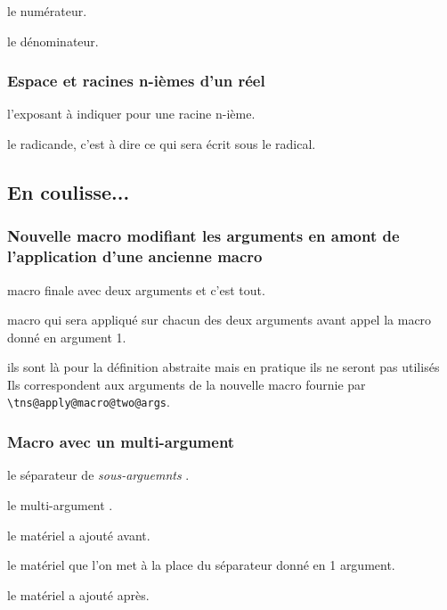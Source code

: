 \documentclass[12pt,a4paper]{article}
\newcommand\env[1]{\texttt{#1}}
\newcommand\macro[1]{\env{\textbackslash{}#1}}
\theoremstyle{definition}
\newcommand\extraspace{
	\vspace{0.25em}
}
\begin{document}
{{{{{{{{{{{\extraspace




 le numérateur.

 le dénominateur.
\subsubsection{Espace et racines n-ièmes d'un réel}




\IDoption{} l'exposant à indiquer pour une racine n-ième.

\IDarg{} le radicande, c'est à dire ce qui sera écrit sous le radical.
\subsection{En coulisse...}

\subsubsection{Nouvelle macro modifiant les arguments en amont de l'application d'une ancienne macro}


 macro finale avec deux arguments et c'est tout.

 macro qui sera appliqué sur chacun des deux arguments avant appel la macro donné en argument 1.

 ils sont là pour la définition abstraite mais en pratique ils ne seront pas utilisés
Ils correspondent aux arguments de la nouvelle macro fournie par \macro{tns@apply@macro@two@args}.
\subsubsection{Macro avec un \og multi-argument \fg}


 le séparateur de \emph{\og sous-arguemnts \fg}.

 le \og multi-argument \fg.

 le matériel a ajouté avant.

 le matériel que l'on met à la place du séparateur donné en 1\ier{} argument.

 le matériel a ajouté après.
}}}}}}}}}}}
\end{document}
